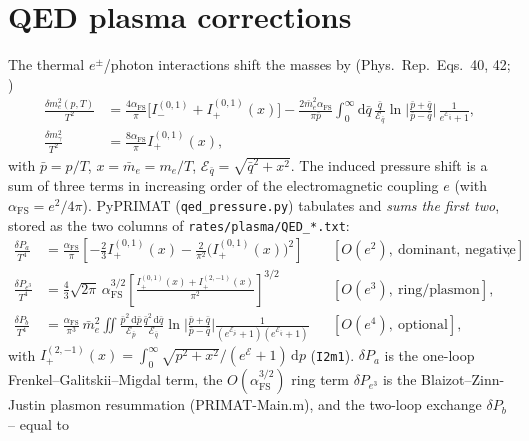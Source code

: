 \documentclass[11pt,a4paper]{article}
\newcommand{\dd}{\mathrm{d}}
\newcommand{\code}[1]{\texttt{#1}}
\newcommand{\PR}{Phys.\ Rep.}
\newcommand{\afs}{\alpha_{\mathrm{FS}}}
\begin{document}
\section{QED plasma corrections}\label{app:qed}
The thermal $e^\pm$/photon interactions shift the masses by (\PR\ Eqs.~40, 42;
\cite{Mangano2001,LopezTurner1998})
\begin{equation}
\begin{aligned}
  \frac{\delta m_e^2(p,T)}{T^2} &= \frac{4\afs}{\pi}\big[I^{(0,1)}_- + I^{(0,1)}_+(x)\big]
     - \frac{2\bar m_e^2\afs}{\pi\bar p}\!\int_0^\infty\!\dd\bar q\,
       \frac{\bar q}{\mathcal{E}_{\bar q}}
       \ln\!\Big|\frac{\bar p+\bar q}{\bar p-\bar q}\Big|\,
       \frac{1}{e^{\mathcal{E}_{\bar q}}+1},\\
  \frac{\delta m_\gamma^2}{T^2} &= \frac{8\afs}{\pi}I^{(0,1)}_+(x),
\end{aligned}
\end{equation}
with $\bar p=p/T$, $x=\bar m_e=m_e/T$, $\mathcal{E}_{\bar q}=\sqrt{\bar q^2+x^2}$.
The induced pressure shift is a sum of three terms in increasing order of the
electromagnetic coupling $e$ (with $\afs=e^2/4\pi$). PyPRIMAT
(\code{qed\_pressure.py}) tabulates and \emph{sums the first two}, stored as the
two columns of \code{rates/plasma/QED\_*.txt}:
\begin{align}
  \frac{\delta P_a}{T^4} &= \frac{\afs}{\pi}\!\left[
     -\frac{2}{3}I^{(0,1)}_+(x) - \frac{2}{\pi^2}\big(I^{(0,1)}_+(x)\big)^2\right]
     && [O(e^2),\ \text{dominant, negative}],\\
  \frac{\delta P_{e^3}}{T^4} &= \frac{4}{3}\sqrt{2\pi}\,\afs^{3/2}
     \left[\frac{I^{(0,1)}_+(x)+I^{(2,-1)}_+(x)}{\pi^2}\right]^{3/2}
     && [O(e^3),\ \text{ring/plasmon}],\\
  \frac{\delta P_b}{T^4} &= \frac{\afs}{\pi^3}\,\bar m_e^2\!
     \iint\!\frac{\bar p^2\,\dd\bar p}{\mathcal{E}_{\bar p}}
     \frac{\bar q^2\,\dd\bar q}{\mathcal{E}_{\bar q}}
     \ln\!\Big|\frac{\bar p+\bar q}{\bar p-\bar q}\Big|
     \frac{1}{(e^{\mathcal{E}_{\bar p}}+1)(e^{\mathcal{E}_{\bar q}}+1)}
     && [O(e^4),\ \text{optional}],
\end{align}
with $I^{(2,-1)}_+(x)=\int_0^\infty\!\sqrt{p^2+x^2}/(e^{\mathcal{E}}+1)\,\dd p$
(\code{I2m1}). $\delta P_a$ is the one-loop Frenkel--Galitskii--Migdal term, the
$O(\afs^{3/2})$ ring term $\delta P_{e^3}$ is the Blaizot--Zinn-Justin plasmon
resummation (PRIMAT-Main.m), and the two-loop exchange $\delta P_b$ -- equal to
\end{document}
